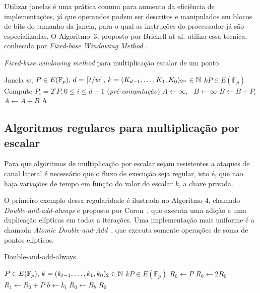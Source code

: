 \documentclass{SBCbookchapter}
\begin{document}
Utilizar janelas é uma prática comum para aumento da eficiência de implementações, já que operandos podem ser descritos e manipulados em blocos de bits do tamanho da janela, para o qual as instruções do processador já são especializadas. O Algoritmo~3, proposto por Brickell at al. utiliza essa técnica, conhecida por \textit{Fixed-base Windowing Method} .

\renewcommand{\algorithmicforall}{\textbf{for each}}
\begin{algorithm}[H]
\caption{\emph{Fixed-base windowing method} para multiplicação escalar de um ponto}
\begin{algorithmic}[1]
    \REQUIRE Janela $w$, $P \in E(\mathbb{F}_p),\, d=\lceil t/w \rceil,\, k=(K_{d-1},\ldots,K_1,K_0)_{2^w} \in \mbox{${\mathbb N}$}$
    \ENSURE $kP \in E(\mathbb{F}_p)$
    \STATE Compute $P_i = 2^{i}P, 0 \le i \le d-1$ (\emph{pré-computação})
    \STATE $A \leftarrow \infty$, \, $B \leftarrow \infty$
            \STATE $B \leftarrow B + P_i$
            \STATE $A \leftarrow A + B$
        \ENDFOR
    \ENDFOR
    \RETURN A
    \end{algorithmic}
\end{algorithm}

\subsection{Algoritmos regulares para multiplicação por escalar}
Para que algoritmos de multiplicação por escalar sejam resistentes a ataques de canal lateral é necessário que o fluxo de execução seja regular, isto é, que não haja variações de tempo em função do valor do escalar $k$, a chave privada.

O primeiro exemplo dessa regularidade é ilustrada no Algoritmo 4, chamado \textit{Double-and-add-always} e proposto por Coron~\cite{Coron1999}, que executa uma adição e uma duplicação elípticas em todas a iterações. Uma implementação mais uniforme é a chamada \textit{Atomic Double-and-Add}~\cite{BatinaChmielewski2014}, que executa somente operações de soma de pontos elípticos.

\begin{algorithm}[H]
\caption{Double-and-add-always}
\begin{algorithmic}[1]
    \REQUIRE $P \in E(\mathbb{F}_p),\, k=(k_{t-1},\ldots,k_1,k_0)_{2} \in \mbox{${\mathbb N}$}$
    \ENSURE $kP \in E(\mathbb{F}_p)$
    \STATE $R_0 \leftarrow P$
        \STATE $R_0 \leftarrow 2R_0$
        \STATE $R_1 \leftarrow R_0 + P$
        \STATE $b \leftarrow k_{i}$
        \STATE $R_0 \leftarrow R_b$
    \ENDFOR
    \RETURN $R_0$
    \end{algorithmic}
\end{algorithm}
\end{document}
